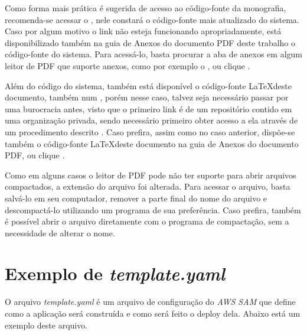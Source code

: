 \begin{apendicesenv}
  Como forma mais prática é sugerida de acesso ao código-fonte da monografia, recomenda-se acessar o , nele constará o código-fonte mais atualizado do sistema. Caso por algum motivo o link não esteja funcionando apropriadamente, está disponibilizado também na guia de Anexos do documento PDF deste trabalho o código-fonte do sistema. Para acessá-lo, basta procurar a aba de anexos em algum leitor de PDF que suporte anexos, como por exemplo o , ou clique
  .

  Além do código do sistema, também está disponível o código-fonte \LaTeX deste documento, também num , porém nesse caso, talvez seja necessário passar por uma burocracia antes, visto que o primeiro link é de um repositório contido em uma organização privada, sendo necessário primeiro obter acesso a ela através de um procedimento descrito . Caso prefira, assim como no caso anterior, dispõe-se também o código-fonte \LaTeX deste documento na guia de Anexos do documento PDF, ou clique
  .

  Como em alguns casos o leitor de PDF pode não ter suporte para abrir arquivos compactados, a extensão do arquivo foi alterada. Para acessar o arquivo, basta salvá-lo em seu computador, remover a parte final do nome do arquivo e descompactá-lo utilizando um programa de sua preferência. Caso prefira, também é possível abrir o arquivo diretamente com o programa de compactação, sem a necessidade de alterar o nome.

  \chapter{Exemplo de \textit{template.yaml}} \label{apendice:ExemploTemplateYAML}

  O arquivo \textit{template.yaml} é um arquivo de configuração do \textit{AWS SAM} que define como a aplicação será construída e como será feito o deploy dela. Abaixo está um exemplo deste arquivo.

  

\end{apendicesenv}
